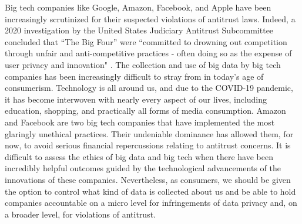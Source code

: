\documentclass[twoside]{article}
\begin{document}
Big tech companies like Google, Amazon, Facebook, and Apple have been increasingly scrutinized for their suspected violations of antitrust laws. Indeed, a 2020 investigation by the United States Judiciary Antitrust Subcommittee concluded that “The Big Four” were “committed to drowning out competition through unfair and anti-competitive practices - often doing so as the expense of user privacy and innovation" \cite{monopoly}. The collection and use of big data by big tech companies has been increasingly difficult to stray from in today’s age of consumerism. Technology is all around us, and due to the COVID-19 pandemic, it has become interwoven with nearly every aspect of our lives, including education, shopping, and practically all forms of media consumption. Amazon and Facebook are two big tech companies that have implemented the most glaringly unethical practices. Their undeniable dominance has allowed them, for now, to avoid serious financial repercussions relating to antitrust concerns. It is difficult to assess the ethics of big data and big tech when there have been incredibly helpful outcomes guided by the technological advancements of the innovations of these companies. Nevertheless, as consumers, we should be given the option to control what kind of data is collected about us and be able to hold companies accountable on a micro level for infringements of data privacy and, on a broader level, for violations of antitrust.

\newpage

\printbibliography
\end{document}
